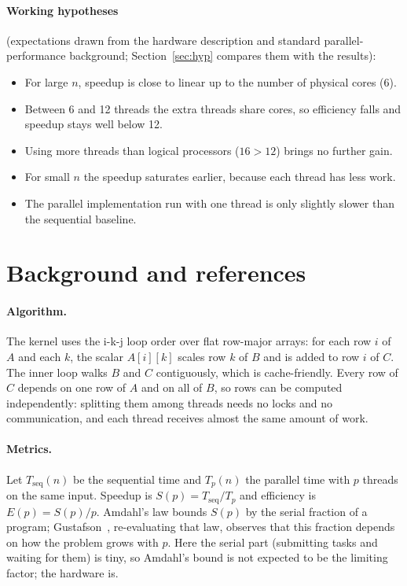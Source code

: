 \documentclass[11pt,a4paper]{article}
\begin{document}
\paragraph{Working hypotheses} (expectations drawn from the hardware description and standard parallel-performance background; Section~\ref{sec:hyp} compares them with the results):
\begin{itemize}
  \item[H1.] For large $n$, speedup is close to linear up to the number of physical cores (6).
  \item[H2.] Between 6 and 12 threads the extra threads share cores, so efficiency falls and speedup stays well below 12.
  \item[H3.] Using more threads than logical processors ($16 > 12$) brings no further gain.
  \item[H4.] For small $n$ the speedup saturates earlier, because each thread has less work.
  \item[H5.] The parallel implementation run with one thread is only slightly slower than the sequential baseline.
\end{itemize}

\section{Background and references}

\paragraph{Algorithm.} The kernel uses the i-k-j loop order over flat row-major arrays: for each row $i$ of $A$ and each $k$, the scalar $A[i][k]$ scales row $k$ of $B$ and is added to row $i$ of $C$. The inner loop walks $B$ and $C$ contiguously, which is cache-friendly. Every row of $C$ depends on one row of $A$ and on all of $B$, so rows can be computed independently: splitting them among threads needs no locks and no communication, and each thread receives almost the same amount of work.

\paragraph{Metrics.} Let $T_{\mathrm{seq}}(n)$ be the sequential time and $T_p(n)$ the parallel time with $p$ threads on the same input. Speedup is $S(p) = T_{\mathrm{seq}} / T_p$ and efficiency is $E(p) = S(p)/p$. Amdahl's law bounds $S(p)$ by the serial fraction of a program; Gustafson~\cite{gustafson}, re-evaluating that law, observes that this fraction depends on how the problem grows with $p$. Here the serial part (submitting tasks and waiting for them) is tiny, so Amdahl's bound is not expected to be the limiting factor; the hardware is.
\end{document}
